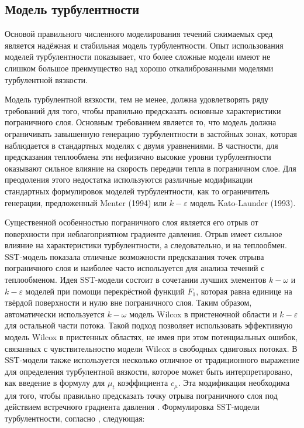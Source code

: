	\subsection{Модель турбулентности}
		\hspace{2em}
		Основой правильного численного моделирования течений сжимаемых сред является надёжная и стабильная модель турбулентности. Опыт использования моделей турбулентности показывает, что более сложные модели имеют не слишком большое преимущество над хорошо откалиброванными моделями турбулентной вязкости.
		
		Модель турбулентной вязкости, тем не менее, должна удовлетворять ряду требований для того, чтобы правильно предсказать основные характеристики пограничного слоя. Основным требованием является то, что модель должна ограничивать завышенную генерацию турбулентности в застойных зонах, которая наблюдается в стандартных моделях с двумя уравнениями. В частности, для предсказания теплообмена эти нефизично высокие уровни турбулентности оказывают сильное влияние на скорость передачи тепла в пограничном слое. Для преодоления этого недостатка используются различные модификации стандартных формулировок моделей турбулентности, как то ограничитель генерации, предложенный Menter (1994) или $k-\varepsilon$ модель Kato-Launder (1993).
		
		Существенной особенностью пограничного слоя является его отрыв от поверхности при неблагоприятном градиенте давления. Отрыв имеет сильное влияние на характеристики турбулентности, а следовательно, и на теплообмен. SST-модель показала отличные	 возможности предсказания точек отрыва пограничного слоя и наиболее часто используется для анализа течений с теплообменом. Идея SST-модели состоит в сочетании лучших элементов $k-\omega$ и $k-\varepsilon$ моделей при помощи перекрёстной функций $F_1$, которая равна единице на твёрдой поверхности и нулю вне пограничного слоя. Таким образом, автоматически используется $k-\omega$ модель Wilcox  в пристеночной области и $k-\varepsilon$ для остальной части потока. Такой подход позволяет использовать эффективную модель Wilcox в пристенных областях, не имея при этом потенциальных ошибок, связанных с чувствительностю модели Wilcox в свободных сдвиговых потоках. В SST-модели также используется несколько отличное от традиционного выражение для определения турбулентной вязкости, которое может быть интерпретировано, как введение в формулу для $\mu_t$ коэффициента $c_{\mu}$. Эта модификация необходима для того, чтобы правильно предсказать точку отрыва пограничного слоя под действием встречного градиента давления \cite{Menter} .
		Формулировка SST-модели турбулентности, согласно \cite{Menter}, следующая:
